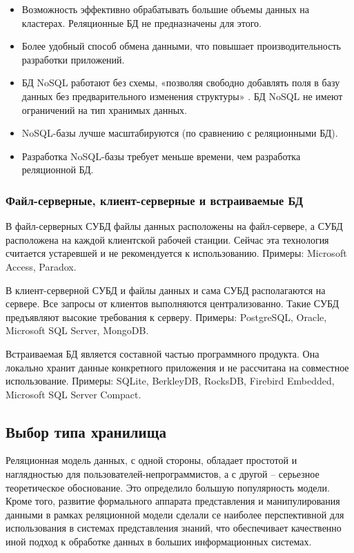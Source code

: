 \documentclass[a4paper,14pt]{article}
\begin{document}
\begin{itemize}
	\item Возможность эффективно обрабатывать большие объемы данных на кластерах. Реляционные БД не предназначены для этого.
	\item Более удобный способ обмена данными, что повышает производительность разработки приложений.
	\item БД NoSQL работают без схемы, «позволяя свободно добавлять поля в базу данных без предварительного изменения структуры» \cite{nosql}. БД NoSQL не имеют ограничений на тип хранимых данных.
	\item NoSQL-базы лучше масштабируются (по сравнению с реляционными БД).
	\item Разработка NoSQL-базы требует меньше времени, чем разработка реляционной БД.
\end{itemize}

\subsubsection{Файл-серверные, клиент-серверные и встраиваемые БД}

В файл-серверных СУБД файлы данных расположены на файл-сервере, а СУБД расположена на каждой клиентской рабочей станции. Сейчас эта технология считается устаревшей и не рекомендуется к использованию. Примеры: Microsoft Access, Paradox.

В клиент-серверной СУБД и файлы данных и сама СУБД располагаются на сервере. Все запросы от клиентов выполняются централизованно. Такие СУБД предъявляют высокие требования к серверу. Примеры: PostgreSQL, Oracle, Microsoft SQL Server, MongoDB.

Встраиваемая БД является составной частью программного продукта. Она локально хранит данные конкретного приложения и не рассчитана на совместное использование. Примеры: SQLite, BerkleyDB, RocksDB, Firebird Embedded, Microsoft SQL Server Compact.

\subsection{Выбор типа хранилища}

Реляционная модель данных, с одной стороны, обладает простотой и наглядностью для пользователей-непрограммистов, а с другой -- серьезное теоретическое обоснование. Это определило большую популярность модели. Кроме того, развитие
формального аппарата представления и манипулирования данными в рамках реляционной модели сделали се наиболее перспективной для использования в системах представления знаний, что обеспечивает качественно иной подход к 
обработке данных в больших информационных системах.
\end{document}
